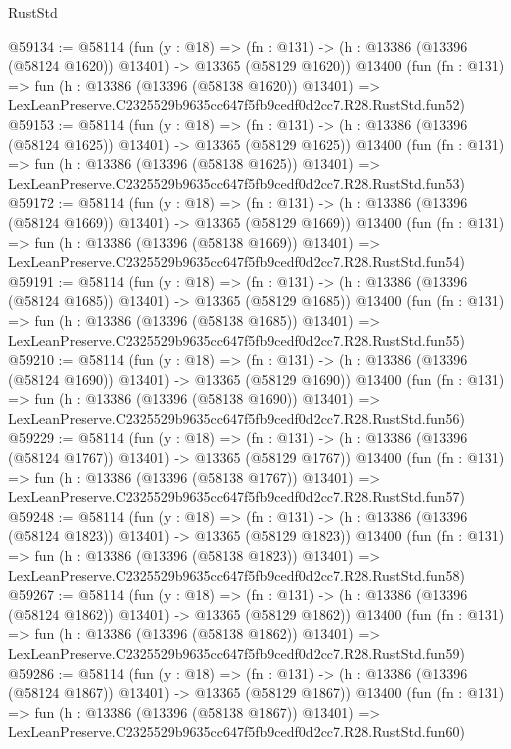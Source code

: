 \begin{lexlean}{RustStd}
\begin{coremodule}
@59134 := @58114
    (fun (y : @18) =>
    (fn : @131) -> (h : @13386 (@13396 (@58124 @1620)) @13401) -> @13365 (@58129 @1620))
    @13400
    (fun (fn : @131) =>
    fun (h : @13386 (@13396 (@58138 @1620)) @13401) =>
    LexLeanPreserve.C2325529b9635cc647f5fb9cedf0d2cc7.R28.RustStd.fun52)
@59153 := @58114
    (fun (y : @18) =>
    (fn : @131) -> (h : @13386 (@13396 (@58124 @1625)) @13401) -> @13365 (@58129 @1625))
    @13400
    (fun (fn : @131) =>
    fun (h : @13386 (@13396 (@58138 @1625)) @13401) =>
    LexLeanPreserve.C2325529b9635cc647f5fb9cedf0d2cc7.R28.RustStd.fun53)
@59172 := @58114
    (fun (y : @18) =>
    (fn : @131) -> (h : @13386 (@13396 (@58124 @1669)) @13401) -> @13365 (@58129 @1669))
    @13400
    (fun (fn : @131) =>
    fun (h : @13386 (@13396 (@58138 @1669)) @13401) =>
    LexLeanPreserve.C2325529b9635cc647f5fb9cedf0d2cc7.R28.RustStd.fun54)
@59191 := @58114
    (fun (y : @18) =>
    (fn : @131) -> (h : @13386 (@13396 (@58124 @1685)) @13401) -> @13365 (@58129 @1685))
    @13400
    (fun (fn : @131) =>
    fun (h : @13386 (@13396 (@58138 @1685)) @13401) =>
    LexLeanPreserve.C2325529b9635cc647f5fb9cedf0d2cc7.R28.RustStd.fun55)
@59210 := @58114
    (fun (y : @18) =>
    (fn : @131) -> (h : @13386 (@13396 (@58124 @1690)) @13401) -> @13365 (@58129 @1690))
    @13400
    (fun (fn : @131) =>
    fun (h : @13386 (@13396 (@58138 @1690)) @13401) =>
    LexLeanPreserve.C2325529b9635cc647f5fb9cedf0d2cc7.R28.RustStd.fun56)
@59229 := @58114
    (fun (y : @18) =>
    (fn : @131) -> (h : @13386 (@13396 (@58124 @1767)) @13401) -> @13365 (@58129 @1767))
    @13400
    (fun (fn : @131) =>
    fun (h : @13386 (@13396 (@58138 @1767)) @13401) =>
    LexLeanPreserve.C2325529b9635cc647f5fb9cedf0d2cc7.R28.RustStd.fun57)
@59248 := @58114
    (fun (y : @18) =>
    (fn : @131) -> (h : @13386 (@13396 (@58124 @1823)) @13401) -> @13365 (@58129 @1823))
    @13400
    (fun (fn : @131) =>
    fun (h : @13386 (@13396 (@58138 @1823)) @13401) =>
    LexLeanPreserve.C2325529b9635cc647f5fb9cedf0d2cc7.R28.RustStd.fun58)
@59267 := @58114
    (fun (y : @18) =>
    (fn : @131) -> (h : @13386 (@13396 (@58124 @1862)) @13401) -> @13365 (@58129 @1862))
    @13400
    (fun (fn : @131) =>
    fun (h : @13386 (@13396 (@58138 @1862)) @13401) =>
    LexLeanPreserve.C2325529b9635cc647f5fb9cedf0d2cc7.R28.RustStd.fun59)
@59286 := @58114
    (fun (y : @18) =>
    (fn : @131) -> (h : @13386 (@13396 (@58124 @1867)) @13401) -> @13365 (@58129 @1867))
    @13400
    (fun (fn : @131) =>
    fun (h : @13386 (@13396 (@58138 @1867)) @13401) =>
    LexLeanPreserve.C2325529b9635cc647f5fb9cedf0d2cc7.R28.RustStd.fun60)

\end{coremodule}
\end{lexlean}
